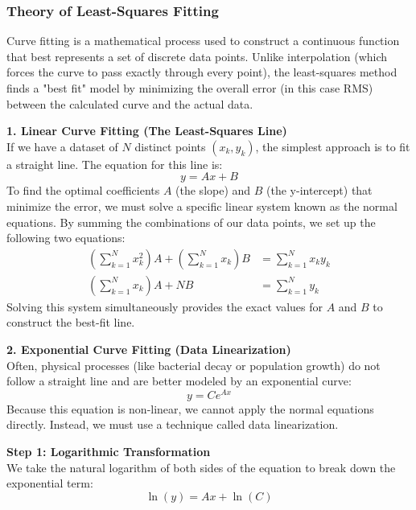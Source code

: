 \subsubsection{Theory of Least-Squares Fitting}

Curve fitting is a mathematical process used to construct a continuous function that best represents a set of discrete data points. Unlike interpolation (which forces the curve to pass exactly through every point), the least-squares method finds a "best fit" model by minimizing the overall error (in this case RMS) between the calculated curve and the actual data.

\vspace{5pt}
\noindent\textbf{1. Linear Curve Fitting (The Least-Squares Line)} \cite[page 255]{MathewsFink2003} \\
If we have a dataset of $N$ distinct points $(x_k, y_k)$, the simplest approach is to fit a straight line. The equation for this line is:
\begin{equation*}
    y = Ax + B
\end{equation*}
To find the optimal coefficients $A$ (the slope) and $B$ (the y-intercept) that minimize the error, we must solve a specific linear system known as the normal equations. By summing the combinations of our data points, we set up the following two equations:
\begin{align*}
    \left(\sum_{k=1}^N x_k^2\right)A + \left(\sum_{k=1}^N x_k\right)B &= \sum_{k=1}^N x_k y_k \\
    \left(\sum_{k=1}^N x_k\right)A + N B &= \sum_{k=1}^N y_k
\end{align*}
Solving this system simultaneously provides the exact values for $A$ and $B$ to construct the best-fit line.

\vspace{5pt}
\noindent\textbf{2. Exponential Curve Fitting (Data Linearization)} \cite[page 263]{MathewsFink2003} \\
Often, physical processes (like bacterial decay or population growth) do not follow a straight line and are better modeled by an exponential curve:
\begin{equation*}
    y = Ce^{Ax}
\end{equation*}
Because this equation is non-linear, we cannot apply the normal equations directly. Instead, we must use a technique called data linearization.

\vspace{5pt}
\noindent\textbf{Step 1: Logarithmic Transformation} \\
We take the natural logarithm of both sides of the equation to break down the exponential term:
\begin{equation*}
    \ln(y) = Ax + \ln(C)
\end{equation*}

